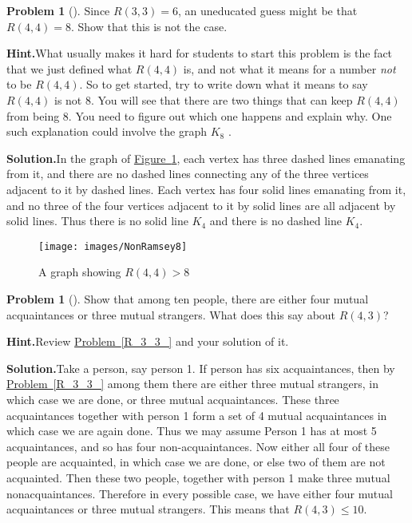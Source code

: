 \documentclass[10pt,]{book}
\theoremstyle{plain}
\theoremstyle{definition}
\newtheorem{activity}[project]{Problem}
\theoremstyle{definition}
\numberwithin{equation}{chapter}
\newcommand{\gt}{>}
\begin{document}
\begin{activity}[]\label{activity-67}
Since \(R(3,3)=6\), an uneducated guess might be that \(R(4,4)=8\). Show that this is not the case.%
\par\medskip\noindent%
\textbf{Hint.}\quad What usually makes it hard for students to start this problem is the fact that we just defined what \(R(4, 4)\) is, and not what it means for a number \emph{not} to be \(R(4, 4)\). So to get started, try to write down what it means to say \(R(4, 4)\) is not 8. You will see that there are two things that can keep \(R(4, 4)\) from being 8. You need to figure out which one happens and explain why. One such explanation could involve the graph \(K_8\) .%
\par\medskip\noindent%
\textbf{Solution.}\quad In the graph of \hyperref[NonRamsey8]{Figure~\ref{NonRamsey8}}, each vertex has three dashed lines emanating from it, and there are no dashed lines connecting any of the three vertices adjacent to it by dashed lines. Each vertex has four solid lines emanating from it, and no three of the four vertices adjacent to it by solid lines are all adjacent by solid lines. Thus there is no solid line \(K_4\) and there is no dashed line \(K_4\).%
\begin{figure}
\centering
\texttt{[image: images/NonRamsey8]}
\caption{A graph showing \(R(4,4) \gt 8\)\label{NonRamsey8}}
\end{figure}
\end{activity}
\begin{activity}[]\label{not_R_4_3}
Show that among ten people, there are either four mutual acquaintances or three mutual strangers. What does this say about \(R(4,3)\)?%
\par\medskip\noindent%
\textbf{Hint.}\quad Review \hyperref[R_3_3_]{Problem~\ref{R_3_3_}} and your solution of it.%
\par\medskip\noindent%
\textbf{Solution.}\quad Take a person, say person 1. If person has six acquaintances, then by \hyperref[R_3_3_]{Problem~\ref{R_3_3_}} among them there are either three mutual strangers, in which case we are done, or three mutual acquaintances. These three acquaintances together with person 1 form a set of 4 mutual acquaintances in which case we are again done. Thus we may assume Person 1 has at most 5 acquaintances, and so has four non-acquaintances. Now either all four of these people are acquainted, in which case we are done, or else two of them are not acquainted. Then these two people, together with person 1 make three mutual nonacquaintances. Therefore in every possible case, we have either four mutual acquaintances or three mutual strangers. This means that \(R(4,3) \le 10\).%
\end{activity}
\end{document}
